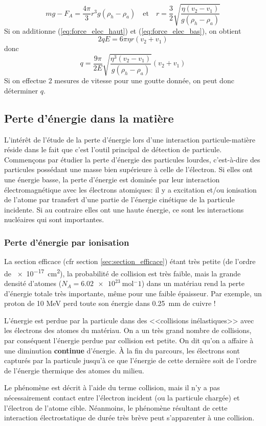 \[
mg-F_A=\dfrac{4\pi}{3}r^3g(\rho_h-\rho_a)\quad\text{et}\quad
r=\dfrac{3}{2}\sqrt{\dfrac{\eta(v_2-v_1)}{g(\rho_h-\rho_a)}}
\]
Si on additionne (\ref{eq:force_elec_haut}) et (\ref{eq:force_elec_bas}), on obtient
\[
    2qE=6\pi\eta r(v_2+v_1)
\]
donc
\[
    q=\dfrac{9\pi}{2E}\sqrt{\dfrac{\eta^3(v_2-v_1)}{g(\rho_h-\rho_a)}}(v_2+v_1)
\]
Si on effectue 2 mesures de vitesse pour une goutte donnée, on peut donc déterminer $q$.

\subsection{Perte d'énergie dans la matière}

L'intérêt de l'étude de la perte d'énergie lors d'une interaction particule-matière réside dans le fait que c'est l'outil principal de détection de particule. Commençons par étudier la perte d'énergie des particules lourdes, c'est-à-dire des particules possédant une masse bien supérieure à celle de l'électron. Si elles ont une énergie basse, la perte d'énergie est dominée par leur interaction électromagnétique avec les électrons atomiques: il y a excitation et/ou ionisation de l'atome par transfert d'une partie de l'énergie cinétique de la particule incidente. Si au contraire elles ont une haute énergie, ce sont les interactions nucléaires qui sont importantes.

\subsubsection{Perte d'énergie par ionisation}
La section efficace (cfr section \ref{sec:section_efficace}) étant très petite (de l'ordre de \SI{e-17}{cm^2}), la probabilité de collision est très faible, mais la grande densité d'atomes ($N_A=\SI{6.02e23}{\mole^-1}$) dans un matériau rend la perte d'énergie totale très importante, même pour une faible épaisseur. Par exemple, un proton de 10 \si{MeV} perd toute son énergie dans \SI{0.25}{mm} de cuivre !

L'énergie est perdue par la particule dans des <<collisions inélastiques>> avec les électrons des atomes du matériau. On a un très grand nombre de collisions, par conséquent l'énergie perdue par collision est petite. On dit qu'on a affaire à une diminution \textbf{continue} d'énergie. À la fin du parcours, les électrons sont capturés par la particule jusqu'à ce que l'énergie de cette dernière soit de l'ordre de l'énergie thermique des atomes du milieu.

\begin{rem}
    Le phénomène est décrit à l'aide du terme collision, mais il n'y a pas nécessairement contact entre l'électron incident (ou la particule chargée) et l'électron de l'atome cible. Néanmoins, le phénomène résultant de cette interaction électrostatique de durée très brève peut s'apparenter à une collision.
\end{rem}

